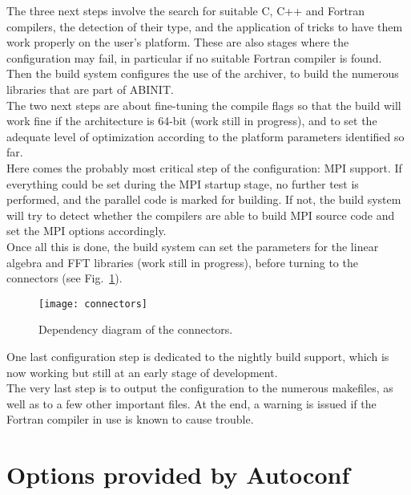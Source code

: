 The three next steps involve the search for suitable C, C++ and Fortran
compilers, the detection of their type, and the application of tricks
to have them work properly on the user's platform. These are also
stages where the configuration may fail, in particular if no suitable
Fortran compiler is found.\\


Then the build system configures the use of the archiver, to build
the numerous libraries that are part of ABINIT.\\


The two next steps are about fine-tuning the compile flags so that
the build will work fine if the architecture is 64-bit (work still
in progress), and to set the adequate level of optimization according
to the platform parameters identified so far.\\


Here comes the probably most critical step of the configuration: MPI
support. If everything could be set during the MPI startup stage,
no further test is performed, and the parallel code is marked for
building. If not, the build system will try to detect whether the
compilers are able to build MPI source code and set the MPI options
accordingly.\\


Once all this is done, the build system can set the parameters for
the linear algebra and FFT libraries (work still in progress), before
turning to the connectors (see Fig.~\ref{fig:cfg-connectors}).\\

\begin{figure}
  \centerline{\texttt{[image: connectors]}}
  \caption{Dependency diagram of the connectors.}
  \label{fig:cfg-connectors}
\end{figure}

One last configuration step is dedicated to the nightly build support,
which is now working but still at an early stage of development.\\


The very last step is to output the configuration to the numerous
makefiles, as well as to a few other important files. At the end,
a warning is issued if the Fortran compiler in use is known to cause
trouble.


\section{Options provided by Autoconf}

